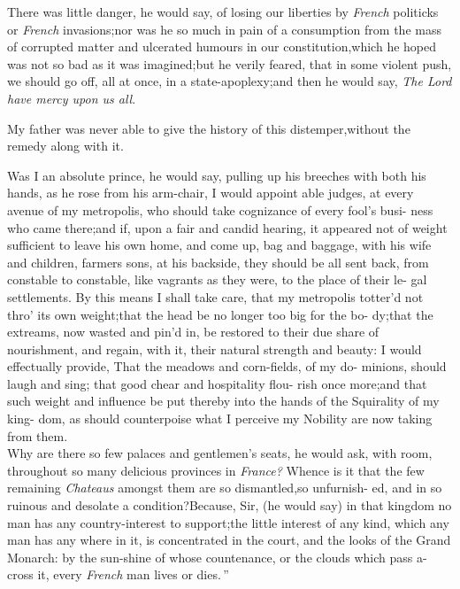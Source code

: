 \documentclass{article}
\begin{document}
There was little danger, he would say, of losing our liberties
by \textit{French} politicks or \textit{French}
invasions;\tsh  nor was he so much in pain of a consumption
from the mass of corrupted matter and ulcerated humours in our
constitution,\tsh\break which he hoped was not so bad as it was
imagined;\tsk  but he verily feared, that in some violent push, we
should go off, all at once, in a state-apoplexy;\tsk  and then he
would say, \textit{The Lord have mercy upon us all}.

My father was never able to give the history of this
distemper,\tsk  without the remedy along with it.

\indent\lqq Was I an absolute prince, he would\break
say, pulling up his breeches with both\break
his hands, as he rose from his arm-chair,\break
\lqq I would appoint able judges, at every\break
\lqq avenue of my metropolis, who should\break
\lqq take cognizance of every fool’s busi-\break
\lqq ness who came there;\tsk and if, upon\break
\lqq a fair and candid hearing, it appeared\break
\lqq not of weight sufficient to leave his\break
\lqq own home, and come up, bag and\break
\lqq baggage, with his wife and children,\break
\lqq farmers sons, \etc \etc at his backside,\break
\lqq they should be all sent back, from\break
\lqq constable to constable, like vagrants 
\lqq as they were, to the place of their le-\break
\lqq gal settlements. By this means I shall\break
\lqq take care, that my metropolis totter’d\break
\lqq not thro’ its own weight;\tsk  that the\break
\lqq head be no longer too big for the bo-\break
\lqq dy;\tsk  that the extreams, now wasted\break
\lqq and pin’d in, be restored to their due\break
\lqq share of nourishment, and regain, with\break
\lqq it, their natural strength and beauty:\tsk\break
\lqq I would effectually provide, That the\break
\lqq meadows and corn-fields, of my do-\break
\lqq minions, should laugh and sing;\tsh\break
\lqq that good chear and hospitality flou-\break
\lqq rish once more;\tsk  and that such weight\break
\lqq and influence be put thereby into the\break
\lqq hands of the Squirality of my king-\break
\lqq dom, as should counterpoise what I\break
\lqq perceive my Nobility are now taking\break
\lqq from them.\\
\newpage
\indent\lqq Why are there so few palaces and\break
\lqq gentlemen’s seats, he would ask, with\break
{}\break
room, \lqq throughout so many delicious\break
\lqq provinces in \textit{France?} Whence is it that\break
\lqq the few remaining \textit{Chateaus} amongst\break
\lqq them are so dismantled,\tsk  so unfurnish-\break
\lqq ed, and in so ruinous and desolate a\break
\lqq condition?\tsh  Because, Sir, (he would\break
say) \lqq in that kingdom no man has any\break
\lqq country-interest to support;\tsk  the little\break
\lqq interest of any kind, which any man\break
\lqq has any where in it, is concentrated in\break
\lqq the court, and the looks of the Grand\break
\lqq Monarch: by the sun-shine of whose\break
\lqq countenance, or the clouds which pass\break
\lqq a-cross it, every \textit{French} man lives or\break
\lqq dies.\,”
\end{document}
